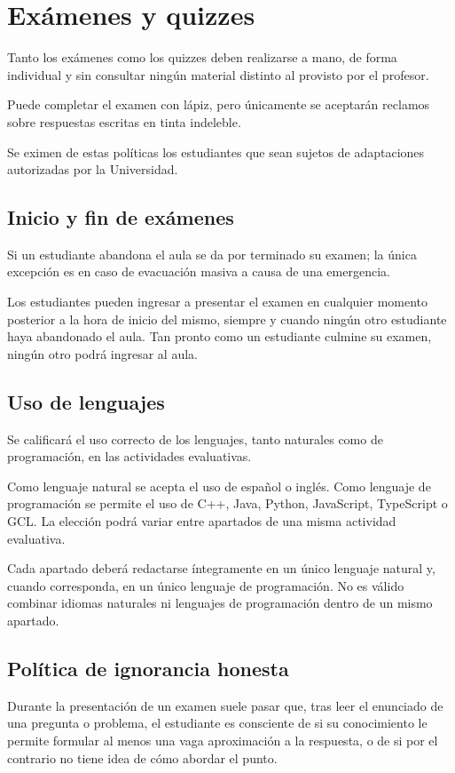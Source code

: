 \section{Exámenes y quizzes}
Tanto los exámenes como los quizzes deben realizarse a mano, de forma individual y sin consultar ningún material distinto al provisto por el profesor.

Puede completar el examen con lápiz, pero únicamente se aceptarán reclamos sobre respuestas escritas en tinta indeleble.

Se eximen de estas políticas los estudiantes que sean sujetos de adaptaciones autorizadas por la Universidad.

\subsection{Inicio y fin de exámenes}
Si un estudiante abandona el aula se da por terminado su examen; la única excepción es en caso de evacuación masiva a causa de una emergencia.

Los estudiantes pueden ingresar a presentar el examen en cualquier momento posterior a la hora de inicio del mismo, siempre y cuando ningún otro estudiante haya abandonado el aula. Tan pronto como un estudiante culmine su examen, ningún otro podrá ingresar al aula.

\subsection{Uso de lenguajes}
Se calificará el uso correcto de los lenguajes, tanto naturales como de programación, en las actividades evaluativas.

Como lenguaje natural se acepta el uso de español o inglés. Como lenguaje de programación se permite el uso de C++, Java, Python, JavaScript, TypeScript o GCL. La elección podrá variar entre apartados de una misma actividad evaluativa.

Cada apartado deberá redactarse íntegramente en un único lenguaje natural y, cuando corresponda, en un único lenguaje de programación. No es válido combinar idiomas naturales ni lenguajes de programación dentro de un mismo apartado.

\subsection{Política de ignorancia honesta}
Durante la presentación de un examen suele pasar que, tras leer el enunciado de una pregunta o problema, el estudiante es consciente de si su conocimiento le permite formular al menos una vaga aproximación a la respuesta, o de si por el contrario no tiene idea de cómo abordar el punto.

